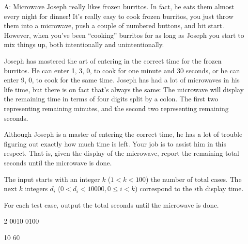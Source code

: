 \begin{problem}{A: Microwave}
Joseph really likes frozen burritos.
In fact, he eats them almost every night for dinner!
It's really easy to cook frozen burritos, you just throw them into a microwave, push a couple of numbered buttons, and hit start.
However, when you've been ``cooking'' burritos for as long as Joseph you start to mix things up, both intentionally and unintentionally.

Joseph has mastered the art of entering in the correct time for the frozen burritos.
He can enter 1, 3, 0, to cook for one minute and 30 seconds, or he can enter 9, 0, to cook for the same time.
Joseph has had a lot of microwaves in his life time, but there is on fact that's always the same:
The microwave will display the remaining time in terms of four digits split by a colon.
The first two representing remaining minutes, and the second two representing remaining seconds.

Although Joseph is a master of entering the correct time, he has a lot of trouble figuring out exactly how much time is left.
Your job is to assist him in this respect.
That is, given the display of the microwave, report the remaining total seconds until the microwave is done.
\end{problem}

\begin{formalin}
The input starts with an integer $k$ ($1 < k < 100$) the number of total cases.
The next $k$ integers $d_i$ ($0 < d_i < 10000, 0 \leq i < k$) correspond to the $i$th display time.
\end{formalin}

\begin{formalout}
For each test case, output the total seconds until the microwave is done.
\end{formalout}

\begin{datain}
2
0010
0100
\end{datain}

\begin{dataout}
10
60
\end{dataout}
